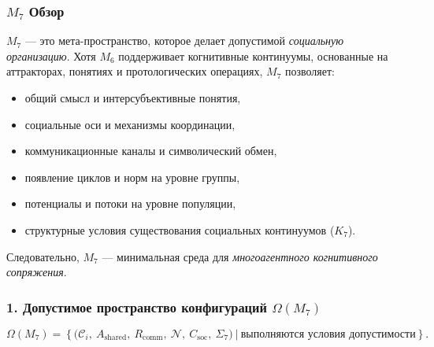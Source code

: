 

\subsubsection{\texorpdfstring{$M_7$}{M_7} Обзор}
\label{sec:m7-overview}

$M_7$ — это мета-пространство, которое делает допустимой \emph{социальную организацию}.
Хотя $M_6$ поддерживает когнитивные континуумы, основанные на аттракторах, понятиях и
протологических операциях, $M_7$ позволяет:

\begin{itemize}
    \item общий смысл и интерсубъективные понятия,
    \item социальные оси и механизмы координации,
    \item коммуникационные каналы и символический обмен,
    \item появление циклов и норм на уровне группы,
    \item потенциалы и потоки на уровне популяции,
    \item структурные условия существования социальных континуумов ($K_7$).
\end{itemize}

Следовательно, $M_7$ — минимальная среда для \emph{многоагентного когнитивного сопряжения}.

\subsubsection*{1. Допустимое пространство конфигураций \texorpdfstring{$\Omega(M_7)$}{\Omega(M_7)}}

\[
\Omega(M_7)=
\left\{
\big(
\mathcal{C}_i,\
A_{\mathrm{shared}},\
R_{\mathrm{comm}},\
\mathcal{N},\
C_{\mathrm{soc}},\
\Sigma_7
\big)
\ \big| \ \text{выполняются условия допустимости}
\right\}.
\]

